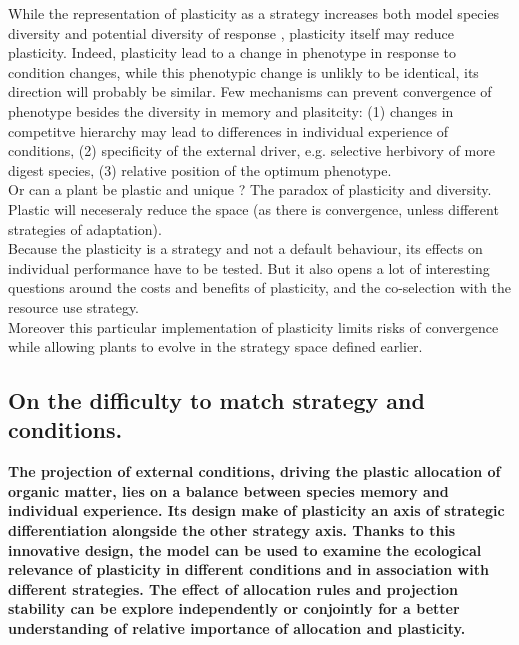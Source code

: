While the representation of plasticity as a strategy increases both model species diversity and potential  diversity of response \cite{ ryser_consequences_2000, kichenin_contrasting_2013}, plasticity itself may reduce plasticity. Indeed, plasticity lead to a change in phenotype in response to condition changes, while this phenotypic change is unlikly to be identical, its direction will probably be similar. Few mechanisms can prevent convergence of phenotype besides the diversity in memory and plasitcity: (1) changes in competitve hierarchy may lead to differences in individual experience of conditions, (2) specificity of the external driver, e.g. selective herbivory of more digest species, (3) relative position of the optimum phenotype.\\



Or can a plant be plastic and unique ? The paradox of plasticity and diversity.\\
Plastic will neceseraly reduce the space (as there is convergence, unless different strategies of adaptation).\\

 Because the plasticity is a strategy and not a default behaviour, its effects on individual performance have to be tested. But it also opens a lot of interesting questions around the costs and benefits of plasticity, and the co-selection with the resource use strategy.\\
Moreover this particular implementation of plasticity limits risks of convergence while allowing plants to evolve in the strategy space defined earlier.

\subsection{On the difficulty to match strategy and conditions.}

 
 
\textbf{The projection of external conditions, driving the plastic allocation of organic matter, lies on a balance between species memory and individual experience. Its design make of plasticity an axis of strategic differentiation alongside the other strategy axis. Thanks to this innovative design, the model can be used to examine the ecological relevance of plasticity in different conditions and in association with different strategies. The effect of allocation rules and projection stability can be explore independently or conjointly for a better understanding of relative importance of allocation and plasticity.}


